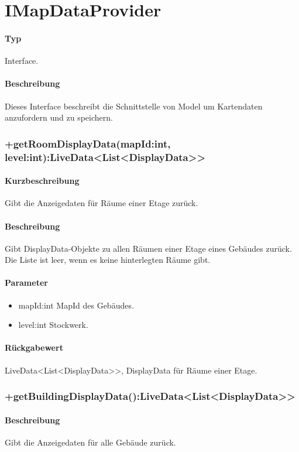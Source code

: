 \section{IMapDataProvider}
\paragraph*{Typ}
Interface.
\paragraph*{Beschreibung}
Dieses Interface beschreibt die Schnittstelle von Model um Kartendaten anzufordern und zu speichern.

\subsubsection{+getRoomDisplayData(mapId:int, level:int):LiveData<List<DisplayData>>}%
\paragraph*{Kurzbeschreibung}
Gibt die Anzeigedaten für Räume einer Etage zurück.
\paragraph*{Beschreibung}
Gibt DisplayData-Objekte zu allen Räumen einer Etage eines Gebäudes zurück.\\
Die Liste ist leer, wenn es keine hinterlegten Räume gibt.
\paragraph*{Parameter}
\begin{itemize}
    \item mapId:int MapId des Gebäudes.
    \item level:int Stockwerk.
\end{itemize}
\paragraph*{Rückgabewert}
LiveData<List<DisplayData>>, DisplayData für Räume einer Etage.

\subsubsection{+getBuildingDisplayData():LiveData<List<DisplayData>>}%
\paragraph*{Beschreibung}
Gibt die Anzeigedaten für alle Gebäude zurück.
